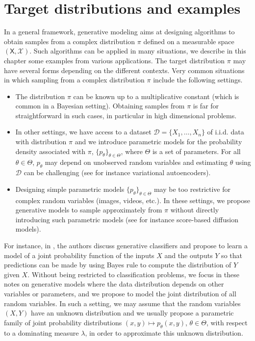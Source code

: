 \documentclass[english,graybox,envcountchap,envcountsame,sectrefs,shortlabels]{svmono}
\theoremstyle{style}
\begin{document}
\chapter{Target distributions and examples}
\minitoc
In a general framework, generative modeling aims at designing algorithms to obtain samples from a complex distribution $\pi$ defined on a measurable space $(\mathsf{X},\mathcal{X})$. Such algorithms can be applied in many situations, we describe in this chapter some examples from various applications. The target distribution $\pi$ may have several forms depending on the different contexts. Very common situations in which sampling from a complex distribution $\pi$ include the following settings.
\begin{itemize}
\item The distribution $\pi$ can be known up to a multiplicative constant (which is common in a Bayesian setting).  Obtaining samples from $\pi$ is far for straightforward in such cases, in particular in high dimensional problems.
\item In other settings, we have access to a dataset $\mathcal{D} = \{X_1,\ldots,X_n\}$ of i.i.d. data with distribution $\pi$ and we introduce parametric models for the probability density associated with $\pi$, $\{p_\theta\}_{\theta\in\Theta}$, where $\Theta$ is a set of parameters. For all $\theta\in\Theta$, $p_\theta$ may depend on unobserved random variables and estimating $\theta$ using  $\mathcal{D}$ can be challenging (see for instance variational autoencoders). 
\item Designing simple parametric models $\{p_\theta\}_{\theta\in\Theta}$ may be too restrictive for complex random variables (images, videos, etc.). In these settings, we propose generative models to sample approximately from $\pi$ without directly introducing such parametric models (see for instance score-based diffusion models).
\end{itemize}

 For instance, in \cite{ng2001discriminative}, the authors discuss generative classifiers and propose to learn a model of a joint probability function of the inputs $X$ and the outputs $Y$ so that predictions can be made by using Bayes rule to compute the distribution of $Y$ given $X$. Without being restricted to classification problems, we focus in these notes on generative models where the data distribution depends on other variables or parameters, and we propose to model the joint distribution of all random variables. In such a setting, we may assume that the random variables $(X,Y)$ have an unknown distribution and we usually propose a parametric family of joint probability distributions $(x,y)\mapsto p_\theta(x,y)$, $\theta\in\Theta$, with respect to a dominating measure $\lambda$, in order to approximate this unknown distribution. 
\end{document}
